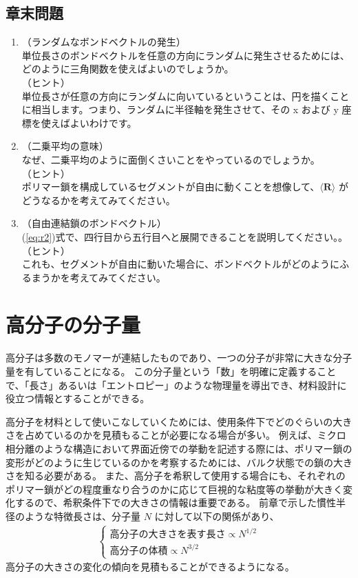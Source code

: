 \documentclass[uplatex,dvipdfmx,a4paper,11pt, titlepage]{jsarticle}
\begin{document}
\subsection{章末問題}
	\begin{enumerate}
	\item
	\label{it:3-1}
	（ランダムなボンドベクトルの発生）\\
	単位長さのボンドベクトルを任意の方向にランダムに発生させるためには、どのように三角関数を使えばよいのでしょうか。\\
	（ヒント）\\
	単位長さが任意の方向にランダムに向いているということは、円を描くことに相当します。つまり、ランダムに半径軸を発生させて、その x および y 座標を使えばよいわけです。

	\item
	\label{it:3-2}
	（二乗平均の意味）\\
	なぜ、二乗平均のように面倒くさいことをやっているのでしょうか。\\
	（ヒント）\\
	ポリマー鎖を構成しているセグメントが自由に動くことを想像して、$\langle \bm{R} \rangle$ がどうなるかを考えてみてください。

	\item
	\label{it:3-3}
	（自由連結鎖のボンドベクトル）\\
	(\ref{eq:r2})式で、四行目から五行目へと展開できることを説明してください。。\\
	（ヒント）\\
	これも、セグメントが自由に動いた場合に、ボンドベクトルがどのようにふるまうかを考えてみてください。

	\end{enumerate}

\newpage
\section{高分子の分子量}

高分子は多数のモノマーが連結したものであり、一つの分子が非常に大きな分子量を有していることになる。
この分子量という「数」を明確に定義することで、「長さ」あるいは「エントロピー」のような物理量を導出でき、材料設計に役立つ情報とすることができる。

高分子を材料として使いこなしていくためには、使用条件下でどのぐらいの大きさを占めているのかを見積もることが必要になる場合が多い。
例えば、ミクロ相分離のような構造において界面近傍での挙動を記述する際には、ポリマー鎖の変形がどのように生じているのかを考察するためには、バルク状態での鎖の大きさを知る必要がある。
また、高分子を希釈して使用する場合にも、それぞれのポリマー鎖がどの程度重なり合うのかに応じて巨視的な粘度等の挙動が大きく変化するので、希釈条件下での大きさの情報は重要である。
前章で示した慣性半径のような特徴長さは、分子量 $N$ に対して以下の関係があり、
\begin{align*}
\begin{cases}
\text{高分子の大きさを表す長さ} \propto N^{1/2} \\[8pt]
\text{高分子の体積} \propto N^{3/2}
\end{cases}
\end{align*}
高分子の大きさの変化の傾向を見積もることができるようになる。
\end{document}
